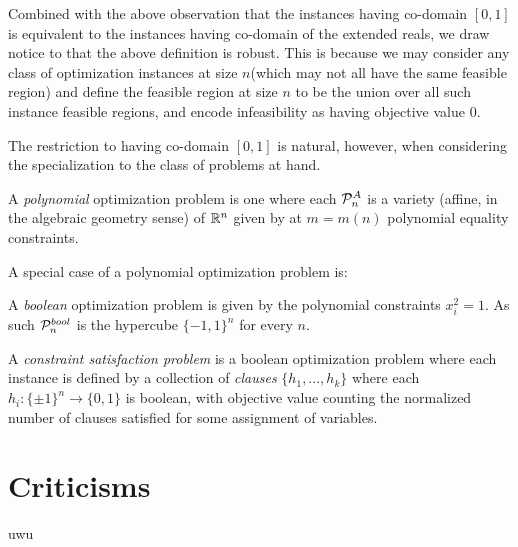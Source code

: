 \documentclass[runningheads,a4paper,english]{llncs}[2022/01/12]
\begin{document}
Combined with the above observation that the instances having co-domain $[0,1]$ is equivalent to the instances having co-domain of the extended reals, we draw notice to that the above definition is robust.
This is because we may consider any class of optimization instances at size $n$(which may not all have the same feasible region) and define the feasible region at size $n$ to be the union over all such instance feasible regions, and encode infeasibility as having objective value $0$.

The restriction to having co-domain $[0,1]$ is natural, however, when considering the specialization to the class of problems at hand.

\begin{definition}
  A \textit{polynomial} optimization problem is one where each $\mathcal{P}_n^A$ is a variety (affine, in the algebraic geometry sense) of $\mathbb{R}^n$ given by at $m = m(n)$ polynomial equality constraints.
\end{definition}
A special case of a polynomial optimization problem is:
\begin{definition}
  A \textit{boolean} optimization problem is given by the polynomial constraints $x_i^2 = 1$. As such $\mathcal{P}_n^{bool}$ is the hypercube $\{-1,1\}^n$ for every $n$.
\end{definition}
\begin{definition}
  A \textit{constraint satisfaction problem} is a boolean optimization problem where each instance is defined by a collection of \textit{clauses} $\{h_1, ..., h_k\}$ where each $h_i : \{\pm 1\}^n \to \{0,1\}$ is boolean, with objective value counting the normalized number of clauses satisfied for some assignment of variables.
\end{definition}

\section{Criticisms}
\label{sec:critisms}
uwu


\end{document}
